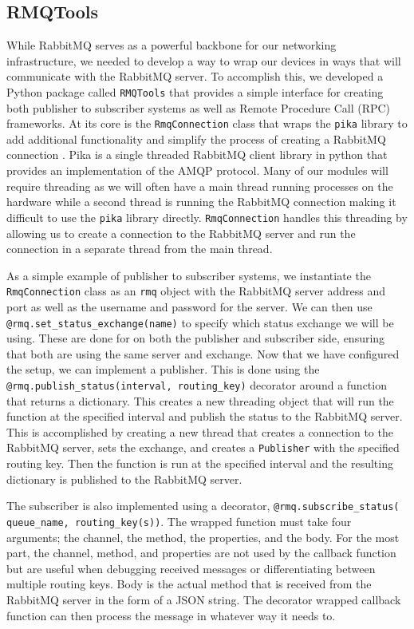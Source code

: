 \subsection{RMQTools}
While RabbitMQ serves as a powerful backbone for our networking infrastructure, we needed to develop a way to wrap our devices in ways that will communicate with the RabbitMQ server.
To accomplish this, we developed a Python package called \texttt{RMQTools} that provides a simple interface for creating both publisher to subscriber systems as well as Remote Procedure Call (RPC) frameworks.
At its core is the \texttt{RmqConnection} class that wraps the \texttt{pika} library to add additional functionality and simplify the process of creating a RabbitMQ connection \parencite{pika}.
Pika is a single threaded RabbitMQ client library in python that provides an implementation of the AMQP protocol.
Many of our modules will require threading as we will often have a main thread running processes on the hardware while a second thread is running the RabbitMQ connection making it difficult to use the \texttt{pika} library directly.
\texttt{RmqConnection} handles this threading by allowing us to create a connection to the RabbitMQ server and run the connection in a separate thread from the main thread.

As a simple example of publisher to subscriber systems, we instantiate the \texttt{RmqConnection} class as an \texttt{rmq} object with the RabbitMQ server address and port as well as the username and password for the server.
We can then use \texttt{@rmq.set\_status\_exchange(name)} to specify which status exchange we will be using. 
These are done for on both the publisher and subscriber side, ensuring that both are using the same server and exchange. 
Now that we have configured the setup, we can implement a publisher.
This is done using the \texttt{@rmq.publish\_status(interval, routing\_key)} decorator around a function that returns a dictionary.
This creates a new threading object that will run the function at the specified interval and publish the status to the RabbitMQ server.
This is accomplished by creating a new thread that creates a connection to the RabbitMQ server, sets the exchange, and creates a \texttt{Publisher} with the specified routing key.
Then the function is run at the specified interval and the resulting dictionary is published to the RabbitMQ server.

The subscriber is also implemented using a decorator, \texttt{@rmq.subscribe\_status( queue\_name, routing\_key(s))}.
The wrapped function must take four arguments; the channel, the method, the properties, and the body.
For the most part, the channel, method, and properties are not used by the callback function but are useful when debugging received messages or differentiating between multiple routing keys.
Body is the actual method that is received from the RabbitMQ server in the form of a JSON string. 
The decorator wrapped callback function can then process the message in whatever way it needs to.

